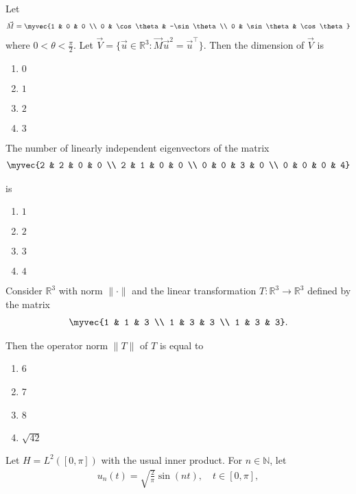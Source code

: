 \item
Let
\begin{align*}
    \vec{M} = \myvec{1 & 0 & 0 \\ 0 & \cos\theta & -\sin\theta \\ 0 & \sin\theta & \cos\theta}
\end{align*}
where $0 < \theta < \frac{\pi}{2}$. Let $\vec{V} = \{ \vec{u} \in \mathbb{R}^3 : \vec{M} \vec{u}^2 = \vec{u}^{\top} \}$. Then the dimension of $\vec{V}$ is
\hfill{}
\begin{multicols}{4}
\begin{enumerate}
    \item $0$
    \item $1$
    \item $2$
    \item $3$
\end{enumerate}
\end{multicols}


\item
The number of linearly independent eigenvectors of the matrix
\begin{align*}
   \myvec{2 & 2 & 0 & 0 \\ 2 & 1 & 0 & 0 \\ 0 & 0 & 3 & 0 \\ 0 & 0 & 0 & 4} 
\end{align*}

is
\hfill{}
\begin{multicols}{4}
\begin{enumerate}
    \item $1$
    \item $2$
    \item $3$
    \item $4$
\end{enumerate}
\end{multicols}
\item
Consider $\mathbb{R}^3$ with norm $\|\cdot\|$ and the linear transformation $T : \mathbb{R}^3 \to \mathbb{R}^3$ defined by the matrix
\begin{align*}
    \myvec{1 & 1 & 3 \\ 1 & 3 & 3 \\ 1 & 3 & 3}.
\end{align*}

Then the operator norm $\|T\|$ of $T$ is equal to
\hfill{}
\begin{multicols}{4}
\begin{enumerate}
    \item 6
    \item 7
    \item 8
    \item $\sqrt{42}$
\end{enumerate}
\end{multicols}
\item
Let $H = L^2([0, \pi])$ with the usual inner product. For $n \in \mathbb{N}$, let
\begin{align*}
    u_n(t) = \sqrt{\frac{2}{\pi}} \sin(n t), \quad t \in [0, \pi],
\end{align*}

